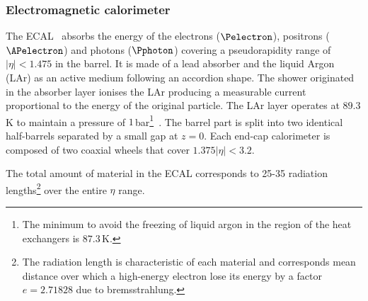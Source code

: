 \subsubsection{Electromagnetic calorimeter}
\label{sec:Chap2:CALO:ECAL}
The ECAL~\cite{Cavallari_2011} absorbs the energy of the electrons ($\Pelectron$), 
positrons ($\APelectron$) and photons ($\Pphoton$) covering a pseudorapidity range 
of $|\eta|<1.475$ in the barrel. It is made of a lead absorber and the liquid Argon 
(LAr) as an active medium following an accordion shape. %
The shower originated in the absorber layer ionises the LAr producing a measurable current proportional to the energy of the original particle. 
The LAr layer operates at $89.3\,$K to maintain a pressure of $1\,$bar\footnote{The minimum to avoid the freezing of liquid argon in the region of the heat exchangers is $87.3\,$K.}~\cite{CERN-LHCC-96-041}. %
The barrel part is split into two identical half-barrels separated by a small gap at $z=0$. 
Each end-cap calorimeter is composed of two coaxial wheels that cover $1.375|\eta|<3.2$. 

The total amount of material in the ECAL corresponds to 25-35 radiation lengths\footnote{The radiation 
length is characteristic of each material and corresponds mean distance 
over which a high-energy electron lose its energy by a factor $e=2.71828$ 
due to bremsstrahlung.} over the entire $\eta$ range.


